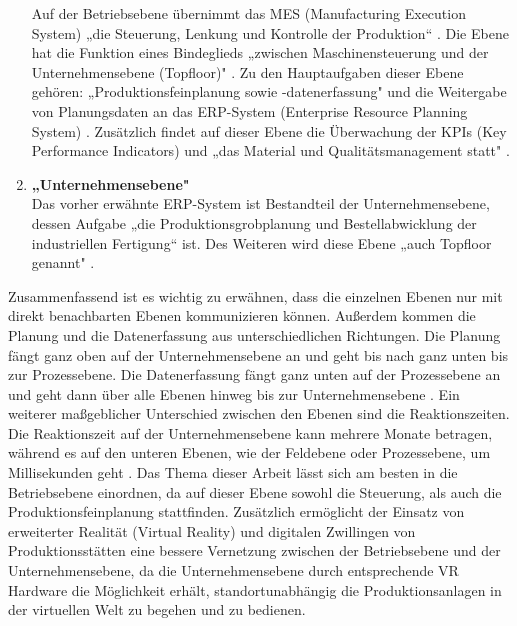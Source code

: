 \begin{enumerate}
	Auf der Betriebsebene übernimmt das MES (Manufacturing Execution System) „die Steuerung, Lenkung und Kontrolle der Produktion“ \cite[S.50]{14}. Die Ebene hat die Funktion eines Bindeglieds „zwischen Maschinensteuerung und der Unternehmensebene (Topfloor)" \cite[S.50]{14}. Zu den Hauptaufgaben dieser Ebene gehören: „Produktionsfeinplanung sowie -datenerfassung" \cite[S.50]{14} und die Weitergabe von Planungsdaten an das ERP-System (Enterprise Resource Planning System) \cite[S.50]{14}.  Zusätzlich findet auf dieser Ebene die Überwachung der KPIs (Key Performance Indicators) und „das Material und Qualitätsmanagement statt" \cite[S.405]{15}.
	\item \textbf{„Unternehmensebene"} \cite[S.50]{14} \\
	Das vorher erwähnte ERP-System ist Bestandteil der Unternehmensebene, dessen Aufgabe „die Produktionsgrobplanung und Bestellabwicklung der industriellen Fertigung“ \cite[S.50]{14} ist. Des Weiteren wird diese Ebene „auch Topfloor genannt" \cite[S.50]{14}.
\end{enumerate}
Zusammenfassend ist es wichtig zu erwähnen, dass die einzelnen Ebenen nur mit direkt benachbarten Ebenen kommunizieren können. Außerdem kommen die Planung und die Datenerfassung aus unterschiedlichen Richtungen. Die Planung fängt ganz oben auf der Unternehmensebene an und geht bis nach ganz unten bis zur Prozessebene. Die Datenerfassung fängt ganz unten auf der Prozessebene an und geht dann über alle Ebenen hinweg bis zur Unternehmensebene \cite[S.50]{14}. Ein weiterer maßgeblicher Unterschied zwischen den Ebenen sind die Reaktionszeiten. Die Reaktionszeit auf der Unternehmensebene kann mehrere Monate betragen, während es auf den unteren Ebenen, wie der Feldebene oder Prozessebene, um Millisekunden geht \cite[S.123]{16}.
\newline
Das Thema dieser Arbeit lässt sich am besten in die Betriebsebene einordnen, da auf dieser Ebene sowohl die Steuerung, als auch die Produktionsfeinplanung stattfinden. Zusätzlich ermöglicht der Einsatz von erweiterter Realität (Virtual Reality) und digitalen Zwillingen von Produktionsstätten eine bessere Vernetzung zwischen der Betriebsebene und der Unternehmensebene, da die Unternehmensebene durch entsprechende VR Hardware die Möglichkeit erhält, standortunabhängig die Produktionsanlagen in der virtuellen Welt zu begehen und zu bedienen.


